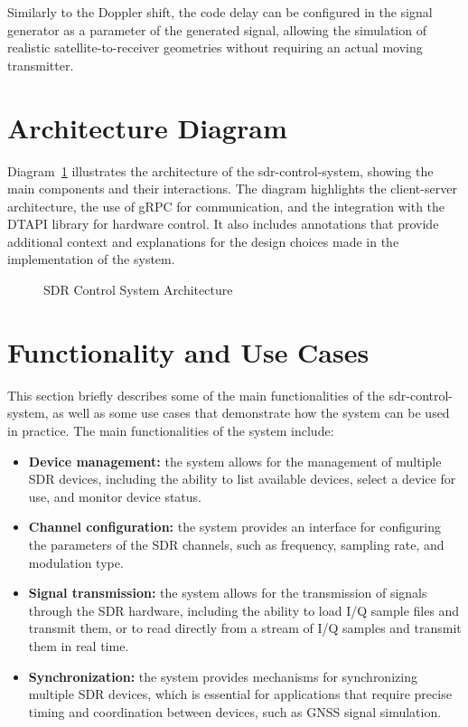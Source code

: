 Similarly to the Doppler shift, the code delay can be configured in the signal
generator as a parameter of the generated signal, allowing the simulation of
realistic satellite-to-receiver geometries without requiring an actual moving
transmitter.

\section{Architecture Diagram}
Diagram~\ref{fig:sdr-control-architecture} illustrates the architecture of the
\gls{sdr-control-system}, showing the main components and their interactions.
The diagram highlights the client-server architecture, the use of \gls{gRPC}
for communication, and the integration with the \gls{DTAPI} library for
hardware control. It also includes annotations that provide additional context
and explanations for the design choices made in the implementation of the
system.

\begin{figure}[htbp]
  \centering
  
  \caption{SDR Control System Architecture}
  \label{fig:sdr-control-architecture}
\end{figure}

\section{Functionality and Use Cases}
\label{sec:sdr-functionality-and-use-cases}
This section briefly describes some of the main functionalities of the
\gls{sdr-control-system}, as well as some use cases that demonstrate how the
system can be used in practice. The main functionalities of the system include:
\begin{itemize}
  \item \textbf{Device management:} the system allows for the management of multiple \gls{SDR} devices, including the ability to list available devices, select a device for use, and monitor device status.
  \item \textbf{Channel configuration:} the system provides an interface for configuring the parameters of the \gls{SDR} channels, such as frequency, sampling rate, and modulation type.
  \item \textbf{Signal transmission:} the system allows for the transmission of signals through the \gls{SDR} hardware, including the ability to load \gls{I/Q} sample files and transmit them, or to read directly from a stream of \gls{I/Q} samples and transmit them in real time.
  \item \textbf{Synchronization:} the system provides mechanisms for synchronizing multiple \gls{SDR} devices, which is essential for applications that require precise timing and coordination between devices, such as \gls{GNSS} signal simulation.
\end{itemize}
